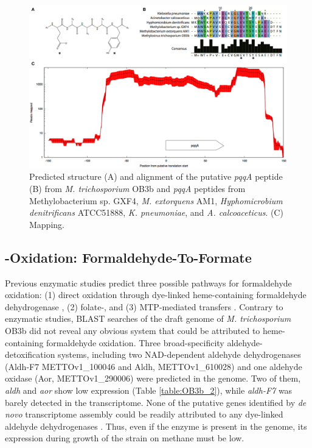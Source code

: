 \begin{figure}[H]
\centering
     \includegraphics[width=1.0\textwidth]{./tex/chapter1/figures/figure2.png}
     \begin{singlespace}
     \caption[\textit{pqqA} structure, alignment, and RNA-seq coverage]{
        Predicted structure
        (A) and alignment of the putative \textit{pqqA} peptide
        (B) from \textit{M. trichosporium} OB3b and \textit{pqqA} peptides from Methylobacterium sp. GXF4, \textit{M. extorquens} AM1,
            \textit{Hyphomicrobium denitrificans} ATCC51888, \textit{K. pneumoniae}, and \textit{A. calcoaceticus}.
        (C) Mapping.}
     \label{fig:B_pqqA}  %
     \end{singlespace}
\end{figure}


\subsection{-Oxidation: Formaldehyde-To-Formate}
Previous enzymatic studies predict three possible pathways for formaldehyde oxidation: (1) direct oxidation through dye-linked heme-containing formaldehyde dehydrogenase \cite{patel1980}, (2) folate-, and (3) MTP-mediated  transfers \cite{vorholt1999, doronina2008}.
Contrary to enzymatic studies, BLAST searches of the draft genome of \textit{M. trichosporium} OB3b did not reveal any obvious system that could be attributed to heme-containing formaldehyde oxidation.
Three broad-specificity aldehyde-detoxification systems, including two NAD-dependent aldehyde dehydrogenases (Aldh-F7 METTOv1\_100046 and Aldh, METTOv1\_610028) and one aldehyde oxidase (Aor, METTOv1\_290006) were predicted in the genome.
Two of them, \textit{aldh} and \textit{aor} show low expression (Table \ref{table:OB3b_2}), while \textit{aldh-F7} was barely detected in the transcriptome.
None of the putative genes identified by \textit{de novo} transcriptome assembly could be readily attributed to any dye-linked aldehyde dehydrogenases \cite{schwartz2004}.
Thus, even if the enzyme is present in the genome, its expression during growth of the strain on methane must be low.


